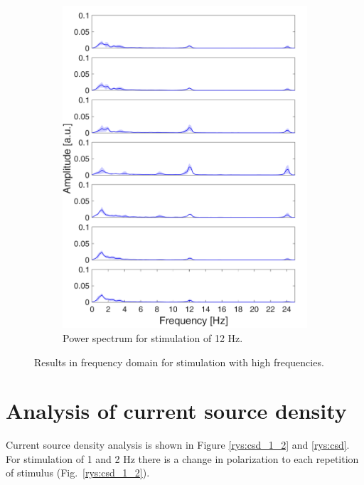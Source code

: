 \documentclass{pracalicmgr}
\begin{document}
\begin{figure}[H]
\begin{subfigure}{.5\textwidth}
		\includegraphics[width=1.\linewidth]{widmo_12Hz.png}
		\caption{Power spectrum for stimulation of 12 Hz.}
		\label{rys:widmo_12Hz}
	\end{subfigure}
	
	\caption{Results in frequency domain for stimulation with high frequencies.}
	\label{rys:srednie_widmo}
	
\end{figure}    
\section{Analysis of current source density}
\label{sec:csd}


Current source density analysis is shown in Figure \ref{rys:csd_1_2} and \ref{rys:csd}. For stimulation of 1 and 2 Hz there is a change in polarization to each repetition of stimulus (Fig.~\ref{rys:csd_1_2}). 
\end{document}
